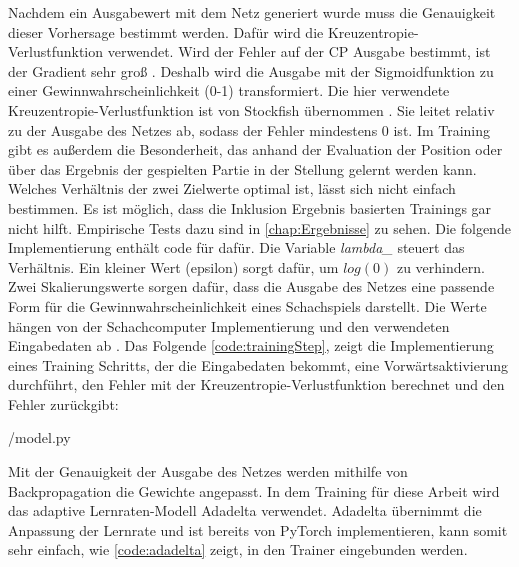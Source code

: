 Nachdem ein Ausgabewert mit dem Netz generiert wurde muss die Genauigkeit dieser Vorhersage bestimmt werden. Dafür wird die Kreuzentropie-Verlustfunktion verwendet. Wird der Fehler auf der \acl{CP} Ausgabe bestimmt, ist der Gradient sehr groß \cite{StockfishNNUE}. Deshalb wird die Ausgabe mit der Sigmoidfunktion zu einer Gewinnwahrscheinlichkeit (0-1) transformiert. Die hier verwendete Kreuzentropie-Verlustfunktion ist von Stockfish übernommen \cite{StockfishNNUE}. Sie leitet relativ zu der Ausgabe des Netzes ab, sodass der Fehler mindestens 0 ist. Im Training gibt es außerdem die Besonderheit, das anhand der Evaluation der Position oder über das Ergebnis der gespielten Partie in der Stellung gelernt werden kann. Welches Verhältnis der zwei Zielwerte optimal ist, lässt sich nicht einfach bestimmen. Es ist möglich, dass die Inklusion Ergebnis basierten Trainings gar nicht hilft. Empirische Tests dazu sind in \autoref{chap:Ergebnisse} zu sehen. Die folgende Implementierung enthält code für dafür. Die Variable \emph{lambda\_} steuert das Verhältnis. Ein kleiner Wert (epsilon) sorgt dafür, um $log(0)$ zu verhindern. Zwei Skalierungswerte sorgen dafür, dass die Ausgabe des Netzes eine passende Form für die Gewinnwahrscheinlichkeit eines Schachspiels darstellt. Die Werte hängen von der Schachcomputer Implementierung und den verwendeten Eingabedaten ab \cite{StockfishNNUE}. Das Folgende \autoref{code:trainingStep}, zeigt die Implementierung eines Training Schritts, der die Eingabedaten bekommt, eine Vorwärtsaktivierung durchführt, den Fehler mit der Kreuzentropie-Verlustfunktion berechnet und den Fehler zurückgibt:


{\srcloc/model.py}

Mit der Genauigkeit der Ausgabe des Netzes werden mithilfe von Backpropagation die Gewichte angepasst. In dem Training für diese Arbeit wird das adaptive Lernraten-Modell Adadelta \cite{Zeiler2012} verwendet. Adadelta übernimmt die Anpassung der Lernrate und ist bereits von PyTorch implementieren, kann somit sehr einfach, wie \autoref{code:adadelta} zeigt, in den Trainer eingebunden werden.

